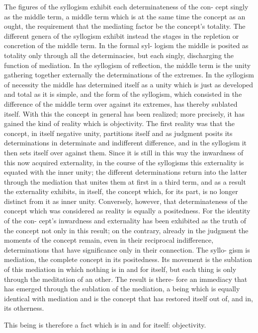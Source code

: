 The figures of the syllogism exhibit each determinateness of the con-
cept singly as the middle term, a middle term which is at the same time
the concept as an ought, the requirement that the mediating factor be the
concept’s totality. The different genera of the syllogism exhibit instead the
stages in the repletion or concretion of the middle term. In the formal syl-
logism the middle is posited as totality only through all the determinacies,
but each singly, discharging the function of mediation. In the syllogism of
reflection, the middle term is the unity gathering together externally the
determinations of the extremes. In the syllogism of necessity the middle
has determined itself as a unity which is just as developed and total as it is
simple, and the form of the syllogism, which consisted in the difference of
the middle term over against its extremes, has thereby sublated itself.
With this the concept in general has been realized; more precisely, it
has gained the kind of reality which is objectivity. The first reality was that
the concept, in itself negative unity, partitions itself and as judgment posits
its determinations in determinate and indifferent difference, and in the
syllogism it then sets itself over against them. Since it is still in this way the
inwardness of this now acquired externality, in the course of the syllogisms
this externality is equated with the inner unity; the different determinations
return into the latter through the mediation that unites them at first in
a third term, and as a result the externality exhibits, in itself, the concept
which, for its part, is no longer distinct from it as inner unity.
Conversely, however, that determinateness of the concept which was
considered as reality is equally a positedness. For the identity of the con-
cept’s inwardness and externality has been exhibited as the truth of the
concept not only in this result; on the contrary, already in the judgment
the moments of the concept remain, even in their reciprocal indifference,
determinations that have significance only in their connection. The syllo-
gism is mediation, the complete concept in its positedness. Its movement is
the sublation of this mediation in which nothing is in and for itself, but
each thing is only through the meditation of an other. The result is there-
fore an immediacy that has emerged through the sublation of the mediation,
a being which is equally identical with mediation and is the concept that
has restored itself out of, and in, its otherness. 

This being is therefore a fact which is in and for itself:
objectivity.